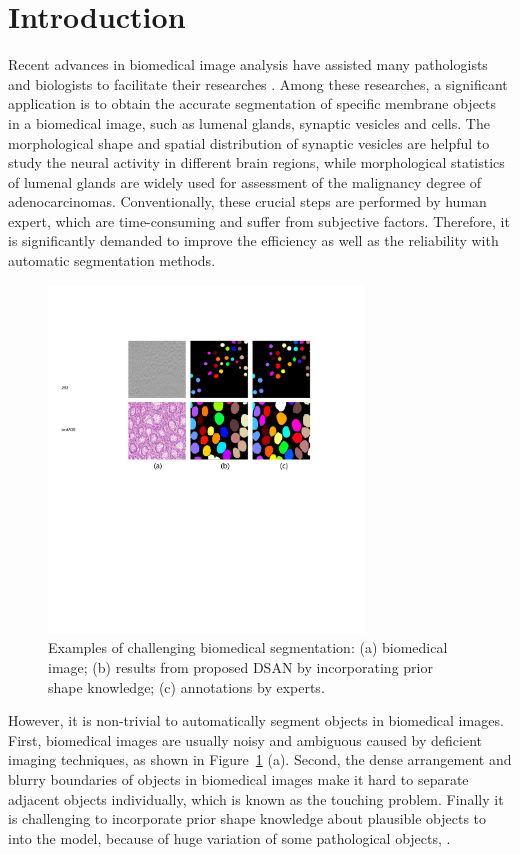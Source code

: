 \section{Introduction}
Recent advances in biomedical image analysis have assisted many pathologists and biologists to facilitate their researches \cite{Chen2016b,Ronneberger2015,Chen2016c,Lieman-Sifry2017,Paszke2016,Tseng2017,Sirinukunwattana2015b}.
Among these researches, a significant application is to obtain the accurate segmentation of specific membrane objects in a biomedical image, such as lumenal glands, synaptic vesicles and cells.
The morphological shape and spatial distribution of synaptic vesicles are helpful to study the neural activity in different brain regions, while morphological statistics of lumenal glands are widely used for assessment of the malignancy degree of adenocarcinomas.
Conventionally, these crucial steps are performed by human expert, which are time-consuming and suffer from subjective factors.
Therefore, it is significantly demanded to improve the efficiency as well as the reliability with automatic segmentation methods.

\begin{figure}
    \begin{center}
        \includegraphics[width=3.3in]{figures/FigImg.pdf}
    \end{center}
    \caption{Examples of challenging biomedical segmentation: (a) biomedical image; (b) results from proposed DSAN by incorporating prior shape knowledge; (c) annotations by experts.}
    \label{FigImgs}
\end{figure}

However, it is non-trivial to automatically segment objects in biomedical images.
First, biomedical images are usually noisy and ambiguous caused by deficient imaging techniques, as shown in Figure~\ref{FigImgs} (a).
Second, the dense arrangement and blurry boundaries of objects in biomedical images make it hard to separate adjacent objects individually, which is known as the touching problem.
Finally it is challenging to incorporate prior shape knowledge about plausible objects to into the model, because of huge variation of some pathological objects, \cite{Sirinukunwattana2015b}.

